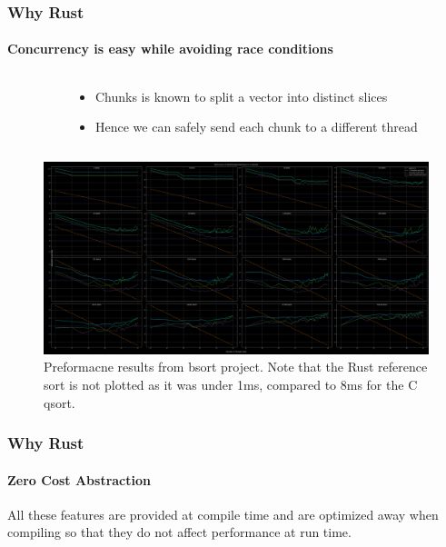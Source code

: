 \documentclass[aspectratio=169]{beamer}
\begin{document}
\begin{frame}
	\frametitle{Why Rust}
	\framesubtitle{Concurrency is easy while avoiding race conditions}
	\begin{columns}
		\begin{column}{ 0.5\textwidth }
			
		\end{column}
		\begin{column}{ 0.4\textwidth }
			\begin{itemize}
				\item Chunks is known to split a vector into distinct slices
				\item Hence we can safely send each chunk to a different thread
			\end{itemize}
		\end{column}
	\end{columns}
\end{frame}

\begin{frame}
    \begin{figure}[ht]
        \centering
		\includegraphics[width=\textwidth]{./figures/project-1-plot.png}
        \caption{Preformacne results from bsort project. Note that the Rust reference sort is not plotted as it was under 1ms, compared to 8ms for the C qsort.}
    \end{figure}
\end{frame}

\begin{frame}
    \frametitle{Why Rust}
    \framesubtitle{Zero Cost Abstraction}

    All these features are provided at compile time and are optimized away when compiling so that they do not affect performance at run time.
\end{frame}
\end{document}
